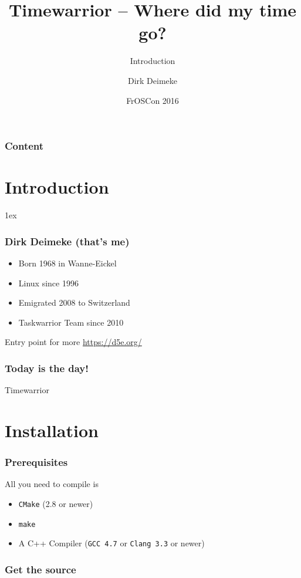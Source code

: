 \documentclass[t,handout]{beamer}
\title{Timewarrior -- Where did my time go?}
\subtitle{Introduction}
\author[Deimeke, Dirk]{Dirk Deimeke}
\institute[Taskwarrior academy]{Taskwarrior academy}
\date{FrOSCon 2016}
\begin{document}
\begin{frame} %
	\titlepage
\end{frame}


\begin{frame}\frametitle{Content}
	\tableofcontents
\end{frame}

\section{Introduction}

\parskip1ex

\begin{frame}[fragile]\frametitle{Dirk Deimeke (that's me)}
    \begin{itemize}
        \item Born 1968 in Wanne-Eickel
        \item Linux since 1996
        \item Emigrated 2008 to Switzerland
        \item Taskwarrior Team since 2010
    \end{itemize}

    Entry point for more \url{https://d5e.org/}
\end{frame}

\begin{frame}[fragile]\frametitle{Today is the day!}
    Timewarrior
\end{frame}

\section{Installation}

\begin{frame}[fragile]\frametitle{Prerequisites}
    All you need to compile is
    \begin{itemize}
        \item \verb+CMake+ (2.8 or newer)
        \item \verb+make+
        \item A C++ Compiler (\verb+GCC 4.7+ or \verb+Clang 3.3+ or newer)
    \end{itemize}
\end{frame}

\begin{frame}[fragile]\frametitle{Get the source}
\end{frame}
\end{document}
